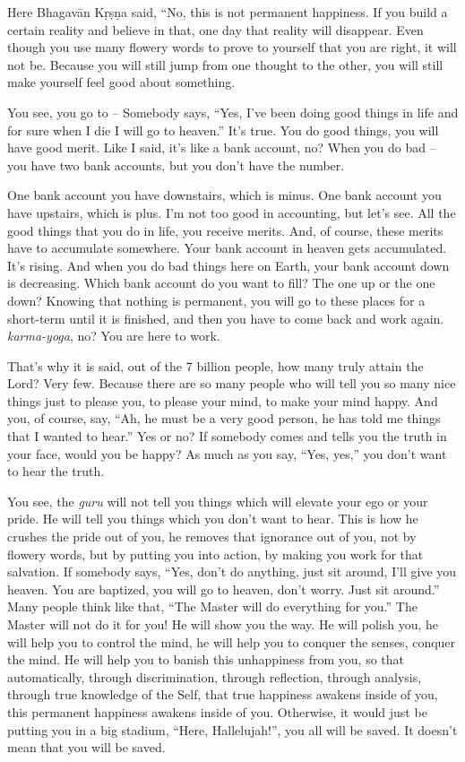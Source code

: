 Here Bhagavān Kṛṣṇa said, “No, this is not permanent happiness. If you build a certain reality and believe in that, one day that reality will disappear. Even though you use many flowery words to prove to yourself that you are right, it will not be. Because you will still jump from one thought to the other, you will still make yourself feel good about something.

You see, you go to – Somebody says, “Yes, I’ve been doing good things in life and for sure when I die I will go to heaven.” It’s true. You do good things, you will have good merit. Like I said, it’s like a bank account, no? When you do bad – you have two bank accounts, but you don’t have the number.

One bank account you have downstairs, which is minus. One bank account you have upstairs, which is plus. I’m not too good in accounting, but let’s see. All the good things that you do in life, you receive merits. And, of course, these merits have to accumulate somewhere. Your bank account in heaven gets accumulated. It’s rising. And when you do bad things here on Earth, your bank account down is decreasing. Which bank account do you want to fill? The one up or the one down? Knowing that nothing is permanent, you will go to these places for a short-term until it is finished, and then you have to come back and work again. \textit{karma-yoga}, no? You are here to work.

That’s why it is said, out of the 7 billion people, how many truly attain the Lord? Very few. Because there are so many people who will tell you so many nice things just to please you, to please your mind, to make your mind happy. And you, of course, say, “Ah, he must be a very good person, he has told me things that I wanted to hear.” Yes or no? If somebody comes and tells you the truth in your face, would you be happy? As much as you say, “Yes, yes,” you don’t want to hear the truth.

You see, the \textit{guru} will not tell you things which will elevate your ego or your pride. He will tell you things which you don’t want to hear. This is how he crushes the pride out of you, he removes that ignorance out of you, not by flowery words, but by putting you into action, by making you work for that salvation. If somebody says, “Yes, don’t do anything, just sit around, I’ll give you heaven. You are baptized, you will go to heaven, don’t worry. Just sit around.” Many people think like that, “The Master will do everything for you.” The Master will not do it for you! He will show you the way. He will polish you, he will help you to control the mind, he will help you to conquer the senses, conquer the mind. He will help you to banish this unhappiness from you, so that automatically, through discrimination, through reflection, through analysis, through true knowledge of the Self, that true happiness awakens inside of you, this permanent happiness awakens inside of you. Otherwise, it would just be putting you in a big stadium, “Here, Hallelujah!”, you all will be saved. It doesn’t mean that you will be saved.

